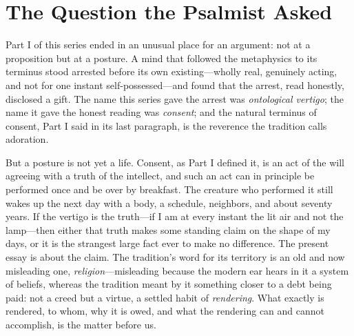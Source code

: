 \section{The Question the Psalmist Asked}

Part I of this series ended in an unusual place for an argument: not at a proposition but at a posture. A mind that followed the metaphysics to its terminus stood arrested before its own existing---wholly real, genuinely acting, and not for one instant self-possessed---and found that the arrest, read honestly, disclosed a gift. The name this series gave the arrest was \emph{ontological vertigo}; the name it gave the honest reading was \emph{consent}; and the natural terminus of consent, Part I said in its last paragraph, is the reverence the tradition calls adoration.

But a posture is not yet a life. Consent, as Part I defined it, is an act of the will agreeing with a truth of the intellect, and such an act can in principle be performed once and be over by breakfast. The creature who performed it still wakes up the next day with a body, a schedule, neighbors, and about seventy years. If the vertigo is the truth---if I am at every instant the lit air and not the lamp---then either that truth makes some standing claim on the shape of my days, or it is the strangest large fact ever to make no difference. The present essay is about the claim. The tradition's word for its territory is an old and now misleading one, \emph{religion}---misleading because the modern ear hears in it a system of beliefs, whereas the tradition meant by it something closer to a debt being paid: not a creed but a virtue, a settled habit of \emph{rendering}. What exactly is rendered, to whom, why it is owed, and what the rendering can and cannot accomplish, is the matter before us.

